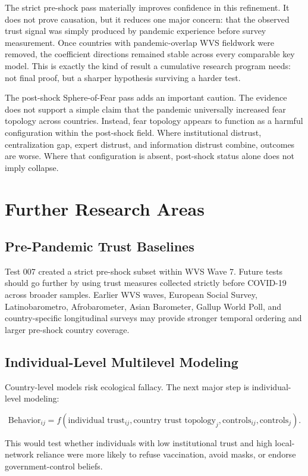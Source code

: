 \documentclass[12pt]{article}
\begin{document}
The strict pre-shock pass materially improves confidence in this refinement. It does not prove causation, but it reduces one major concern: that the observed trust signal was simply produced by pandemic experience before survey measurement. Once countries with pandemic-overlap WVS fieldwork were removed, the coefficient directions remained stable across every comparable key model. This is exactly the kind of result a cumulative research program needs: not final proof, but a sharper hypothesis surviving a harder test.

The post-shock Sphere-of-Fear pass adds an important caution. The evidence does not support a simple claim that the pandemic universally increased fear topology across countries. Instead, fear topology appears to function as a harmful configuration within the post-shock field. Where institutional distrust, centralization gap, expert distrust, and information distrust combine, outcomes are worse. Where that configuration is absent, post-shock status alone does not imply collapse.

\section{Further Research Areas}

\subsection{Pre-Pandemic Trust Baselines}

Test 007 created a strict pre-shock subset within WVS Wave 7. Future tests should go further by using trust measures collected strictly before COVID-19 across broader samples. Earlier WVS waves, European Social Survey, Latinobarometro, Afrobarometer, Asian Barometer, Gallup World Poll, and country-specific longitudinal surveys may provide stronger temporal ordering and larger pre-shock country coverage.

\subsection{Individual-Level Multilevel Modeling}

Country-level models risk ecological fallacy. The next major step is individual-level modeling:

\[
\text{Behavior}_{ij} =
f(\text{individual trust}_{ij},
\text{country trust topology}_{j},
\text{controls}_{ij},
\text{controls}_{j}).
\]

This would test whether individuals with low institutional trust and high local-network reliance were more likely to refuse vaccination, avoid masks, or endorse government-control beliefs.
\end{document}
